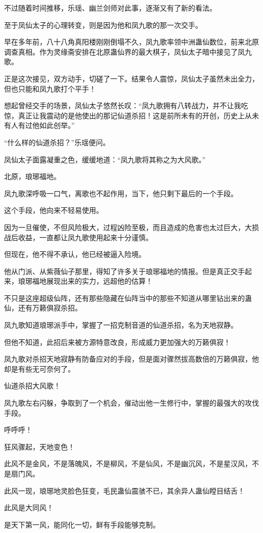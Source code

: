 \begin{this_body}
不过随着时间推移，乐瑶、幽兰剑师对此事，逐渐又有了新的看法。

至于凤仙太子的心理转变，则是因为他和凤九歌的那一次交手。

早在多年前，八十八角真阳楼刚刚倒塌不久，凤九歌率领中洲蛊仙数位，前来北原调查真相。作为灵缘斋安排在北原蛊仙界的最大棋子，凤仙太子暗中接见了凤九歌。

正是这次接见，双方动手，切磋了一下。结果令人震惊，凤仙太子虽然未出全力，但也只能和凤九歌打个平手！

想起曾经交手的场景，凤仙太子悠然长叹：“凤九歌拥有八转战力，并不让我吃惊，真正让我震动的是他使出的那记仙道杀招！这是前所未有的开创，历史上从未有人有过他如此创举。”

“什么样的仙道杀招？”乐瑶便问。

凤仙太子面露凝重之色，缓缓地道：“凤九歌将其称之为大风歌。”

北原，琅琊福地。

凤九歌深呼吸一口气，离歌也不起作用，当下，他只剩下最后的一个手段。

这个手段，他向来不轻易使用。

因为一旦催使，不但风险极大，过程凶险至极，而且造成的危害也太过巨大，大损战后收益，一直都让凤九歌使用起来十分谨慎。

但现在，他不得不承认，他已经被逼入险境。

他从门派、从紫薇仙子那里，得知了许多关于琅琊福地的情报。但是真正交手起来，琅琊福地展现出来的实力，远超他的估算！

不只是这座超级仙阵，还有那些隐藏在仙阵当中的那些不知道从哪里钻出来的蛊仙，还有万籁俱寂杀招。

凤九歌知道琅琊派手中，掌握了一招克制音道的仙道杀招，名为天地寂静。

但他不知道，此招后来被方源特意改良，形成威力更加强大的万籁俱寂！

凤九歌对杀招天地寂静有防备应对的手段，但是面对骤然拔高数倍的万籁俱寂，他却是有些无可奈何了。

仙道杀招大风歌！

凤九歌左右闪躲，争取到了一个机会，催动出他一生修行中，掌握的最强大的攻伐手段。

呼呼呼！

狂风骤起，天地变色！

此风不是金风，不是落魄风，不是柳风，不是仙风，不是幽沉风，不是星汉风，不是扇门风。

此风一现，琅琊地灵脸色狂变，毛民蛊仙震骇不已，其余异人蛊仙瞠目结舌！

此风是大同风！

是天下第一风，能同化一切，鲜有手段能够克制。


\end{this_body}
